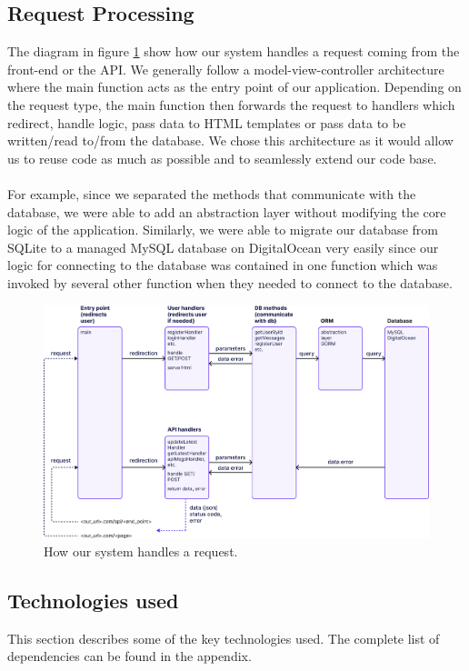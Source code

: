 \documentclass{article}
\begin{document}
\subsection{Request Processing}
The diagram in figure \ref{fig:request_pipeline} show how our system handles a request coming from the front-end or the API. We generally follow a model-view-controller architecture where the main function acts as the entry point of our application. Depending on the request type, the main function then forwards the request to handlers which redirect, handle logic, pass data to HTML templates or pass data to be written/read to/from the database. We chose this architecture as it would allow us to reuse code as much as possible and to seamlessly extend our code base. 
\\\\
For example, since we separated the methods that communicate with the database, we were able to add an abstraction layer without modifying the core logic of the application. Similarly, we were able to migrate our database from SQLite to a managed MySQL database on DigitalOcean very easily since our logic for connecting to the database was contained in one function which was invoked by several other function when they needed to connect to the database.

\begin{figure}[ht]
    \centering
    \includegraphics[width=1.0\textwidth]{./images/request_pipeline_v2.png}
    \caption{How our system handles a request.}
    \label{fig:request_pipeline}
\end{figure}

\subsection{Technologies used}
This section describes some of the key technologies used. The complete list of dependencies can be found in the appendix.
\end{document}
